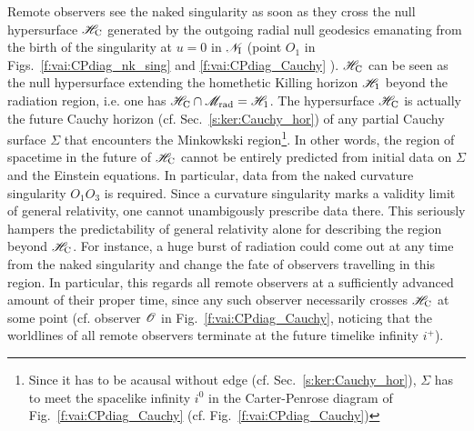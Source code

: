 Remote observers see the naked singularity as soon as they cross
the null hypersurface $\mathscr{H}_{\rm C}$ generated by the outgoing radial null geodesics
emanating from the birth of the singularity at $u=0$ in $\mathscr{N}_{\rm I}$
(point $O_1$ in Figs.~\ref{f:vai:CPdiag_nk_sing} and \ref{f:vai:CPdiag_Cauchy} ).
$\mathscr{H}_{\rm C}$ can be seen as the null hypersurface extending the
homethetic Killing horizon $\mathscr{H}_1$ beyond the radiation region, i.e. one has
$\mathscr{H}_{\rm C} \cap \mathscr{M}_{\rm rad} = \mathscr{H}_1$.
The hypersurface $\mathscr{H}_{\rm C}$ is actually the future Cauchy horizon (cf. Sec.~\ref{s:ker:Cauchy_hor})
of any partial Cauchy surface $\Sigma$ that encounters the Minkowkski region\footnote{Since it
has to be acausal without edge (cf. Sec.~\ref{s:ker:Cauchy_hor}), $\Sigma$ has to meet the spacelike infinity $i^0$
in the Carter-Penrose diagram of Fig.~\ref{f:vai:CPdiag_Cauchy} (cf. Fig.~\ref{f:vai:CPdiag_Cauchy})}.
In other words, the region of spacetime in the future of $\mathscr{H}_{\rm C}$ cannot
be entirely predicted from initial data on $\Sigma$ and the Einstein equations.
In particular, data from the naked curvature singularity $O_1 O_3$ is required.
Since a curvature singularity marks a validity limit of general relativity,
one cannot unambigously prescribe data there. This seriously hampers the
predictability of general relativity alone for describing the region
beyond $\mathscr{H}_{\rm C}$. For instance, a huge burst of radiation could come
out at any time from the naked singularity and change the fate of observers
travelling in this region. In particular, this regards all remote observers at a sufficiently
advanced amount of their proper time, since any such observer necessarily crosses
$\mathscr{H}_{\rm C}$ at some point (cf. observer $\mathscr{O}$ in Fig.~\ref{f:vai:CPdiag_Cauchy},
noticing that the worldlines of all remote observers
terminate at the future timelike infinity $i^+$).


















